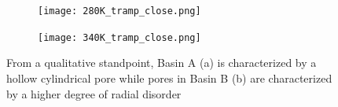 \documentclass{article}
\begin{document}
  \begin{figure}[!ht]
        \centering
        \begin{subfigure}[b]{0.475\textwidth}
                \centering
                \texttt{[image: 280K\_tramp\_close.png]}
                \caption{}\label{fig:abasin}
        \end{subfigure}
        \begin{subfigure}[b]{0.475\textwidth}
                \centering
                \texttt{[image: 340K\_tramp\_close.png]}
                \caption{}\label{fig:bbasin}
        \end{subfigure}
	\caption{From a qualitative standpoint, Basin A (a) is characterized by a
	hollow cylindrical pore while pores in Basin B (b) are characterized by a
	higher degree of radial disorder}\label{fig:basins}
  \end{figure}
\end{document}
